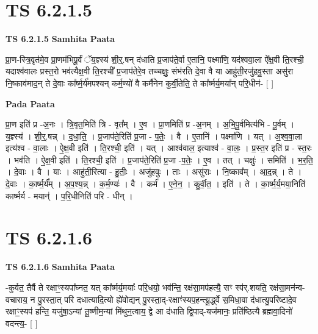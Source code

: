 \documentclass[17pt]{extarticle}
\begin{document}
\section*{ TS 6.2.1.5 }

\textbf{TS 6.2.1.5 } \newline
\textbf{Samhita Paata} \newline

प्रा॒ण-स्त्रि॒वृत॑मे॒व प्रा॒णम॑भिपू॒र्वं ॅय॒ज्ञ्स्य॑ शी॒र्॒.षन् द॑धाति प्र॒जाप॑ते॒र्वा ए॒तानि॒ पक्ष्मा॑णि॒ यद॑श्ववा॒ला ऐ᳚क्ष॒वी ति॒रश्ची॒ यदाश्व॑वालः प्रस्त॒रो भव॑त्यैक्ष॒वी ति॒रश्ची᳚ प्र॒जाप॑तेरे॒व तच्चक्षुः॒ संभ॑रति दे॒वा वै या आहु॑ती॒रजु॑हवु॒स्ता असु॑रा नि॒ष्काव॑माद॒न् ते दे॒वाः का᳚र्ष्म॒र्य॑मपश्यन् कर्म॒ण्यो॑ वै कर्मै॑नेन कुर्वी॒तेति॒ ते का᳚र्ष्मर्य॒मया᳚न् परि॒धीन॑- [  ] \newline

\textbf{Pada Paata} \newline

प्रा॒ण इति॑ प्र -अ॒नः । त्रि॒वृत॒मिति॑ त्रि - वृत᳚म् । ए॒व । प्रा॒णमिति॑ प्र -अ॒नम् । अ॒भि॒पू॒र्वमित्य॑भि - पू॒र्वम् । य॒ज्ञ्स्य॑ । शी॒र्॒.षन्न् । द॒धा॒ति॒ । प्र॒जाप॑ते॒रिति॑ प्र॒जा - प॒तेः॒ । वै । ए॒तानि॑ । पक्ष्मा॑णि । यत् । अ॒श्व॒वा॒ला इत्य॑श्व - वा॒लाः । ऐ॒क्ष॒वी इति॑ । ति॒रश्ची॒ इति॑ । यत् । आश्व॑वाल॒ इत्याश्व॑ - वा॒लः॒ । प्र॒स्त॒र इति॑ प्र - स्त॒रः । भव॑ति । ऐ॒क्ष॒वी इति॑ । ति॒रश्ची॒ इति॑ । प्र॒जाप॑ते॒रिति॑ प्र॒जा -प॒तेः॒ । ए॒व । तत् । चक्षुः॑ । समिति॑ । भ॒र॒ति॒ । दे॒वाः । वै । याः । आहु॑ती॒रित्या - हु॒तीः॒ । अजु॑हवुः । ताः । असु॑राः । नि॒ष्काव᳚म् । आ॒द॒न्न् । ते । दे॒वाः । का॒र्ष्म॒र्य᳚म् । अ॒प॒श्य॒न्न् । क॒र्म॒ण्यः॑ । वै । कर्म॑ । ए॒ने॒न॒ । कु॒र्वी॒त॒ । इति॑ । ते । का॒र्ष्म॒र्य॒मया॒निति॑ कार्ष्मर्य - मयान्॑ । प॒रि॒धीनिति॑ परि - धीन् ।  \newline




\section*{ TS 6.2.1.6 }

\textbf{TS 6.2.1.6 } \newline
\textbf{Samhita Paata} \newline

-कुर्वत॒ तैर्वै ते रक्षाꣳ॒॒स्यपा᳚घ्नत॒ यत् का᳚र्ष्मर्य॒मयाः᳚ परि॒धयो॒ भव॑न्ति॒ रक्ष॑सा॒मप॑हत्यै॒ सꣳ स्प॑र्.शयति॒ रक्ष॑सा॒मन॑न्व-वचाराय॒ न पु॒रस्ता॒त् परि॑ दधात्यादि॒त्यो ह्ये॑वोद्यन् पु॒रस्ता॒द्-रक्षाꣳ॑स्यप॒हन्त्यू॒र्द्ध्वे स॒मिधा॒वा द॑धात्यु॒परि॑ष्टादे॒व रक्षाꣳ॒॒स्यप॑ हन्ति॒ यजु॑षा॒ऽन्यां तू॒ष्णीम॒न्यां मि॑थुन॒त्वाय॒ द्वे आ द॑धाति द्वि॒पाद्-यज॑मानः॒ प्रति॑ष्ठित्यै ब्रह्मवा॒दिनो॑ वदन्त्य॒- [  ] \newline
\end{document}
